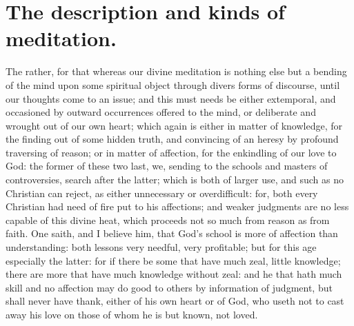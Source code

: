 \chapter{The description and kinds of meditation.}
The rather, for that whereas our divine meditation is nothing else but a bending of the mind upon some spiritual object through divers forms of discourse, until our thoughts come to an issue; and this must needs be either extemporal, and occasioned by outward occurrences offered to the mind, or deliberate and wrought out of our own heart; which again is either in matter of knowledge, for the finding out of some hidden truth, and convincing of an heresy by profound traversing of reason; or in matter of affection, for the enkindling of our love to God: the former of these two last, we, sending to the schools and masters of controversies, search after the latter; which is both of larger use, 
and such as no Christian can reject, as either unnecessary or overdifficult: for, both every Christian had need of fire put to his affections; and weaker judgments are no less capable of this divine heat, which proceeds not so much from reason as from faith. One saith, and I believe him, that God's school is more of affection than understanding: both lessons very needful, very profitable; but for this age especially the latter: for if there be some that have much zeal, little knowledge; there are more that have much knowledge without zeal: and he that hath much skill and no affection may do good to others by information of judgment, but shall never have thank, either of his own heart or of God, who useth not to cast away his love on those of whom he is but known, not loved.

